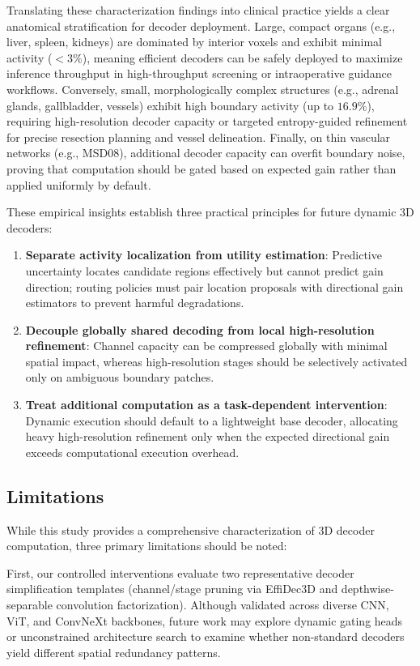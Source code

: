 Translating these characterization findings into clinical practice yields a clear anatomical stratification for decoder deployment. Large, compact organs (e.g., liver, spleen, kidneys) are dominated by interior voxels and exhibit minimal activity (${<}3\%$), meaning efficient decoders can be safely deployed to maximize inference throughput in high-throughput screening or intraoperative guidance workflows. Conversely, small, morphologically complex structures (e.g., adrenal glands, gallbladder, vessels) exhibit high boundary activity (up to $16.9\%$), requiring high-resolution decoder capacity or targeted entropy-guided refinement for precise resection planning and vessel delineation. Finally, on thin vascular networks (e.g., MSD08), additional decoder capacity can overfit boundary noise, proving that computation should be gated based on expected gain rather than applied uniformly by default.

These empirical insights establish three practical principles for future dynamic 3D decoders:
\begin{enumerate}
    \item \textbf{Separate activity localization from utility estimation}: Predictive uncertainty locates candidate regions effectively but cannot predict gain direction; routing policies must pair location proposals with directional gain estimators to prevent harmful degradations.
    \item \textbf{Decouple globally shared decoding from local high-resolution refinement}: Channel capacity can be compressed globally with minimal spatial impact, whereas high-resolution stages should be selectively activated only on ambiguous boundary patches.
    \item \textbf{Treat additional computation as a task-dependent intervention}: Dynamic execution should default to a lightweight base decoder, allocating heavy high-resolution refinement only when the expected directional gain exceeds computational execution overhead.
\end{enumerate}

\subsection{Limitations}
\label{sec:limitations}

While this study provides a comprehensive characterization of 3D decoder computation, three primary limitations should be noted:

First, our controlled interventions evaluate two representative decoder simplification templates (channel/stage pruning via EffiDec3D and depthwise-separable convolution factorization). Although validated across diverse CNN, ViT, and ConvNeXt backbones, future work may explore dynamic gating heads or unconstrained architecture search to examine whether non-standard decoders yield different spatial redundancy patterns.

